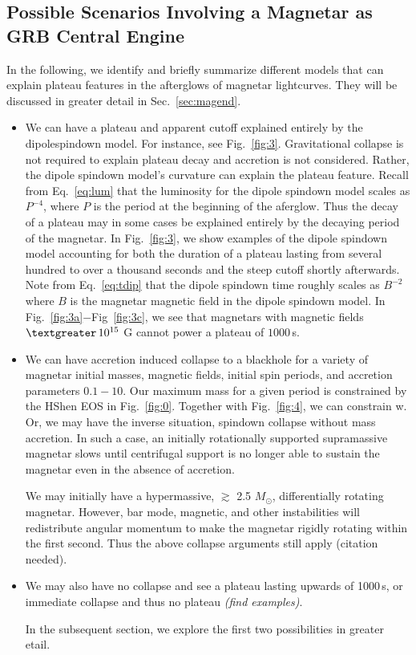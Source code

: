 \documentclass{article}
\begin{document}
\subsection{Possible Scenarios Involving a Magnetar as GRB Central Engine}

In the following, we identify and briefly summarize different models that can explain plateau features in the afterglows of magnetar lightcurves. They will be discussed in greater detail in Sec.~\ref{sec:magend}.

\begin{itemize}
\item We can have a plateau and apparent cutoff explained entirely by the dipolespindown model. For instance, see Fig.~\ref{fig:3}. Gravitational collapse is not required to explain plateau decay and accretion is not considered. Rather, the dipole spindown model's curvature can explain the plateau feature. Recall from Eq.~\ref{eq:lum} that the luminosity for the dipole spindown model scales as $P^{-4}$, where $P$ is the period at the beginning of the aferglow. Thus the decay of a plateau may in some cases be explained entirely by the decaying period of the magnetar. In Fig.~\ref{fig:3}, we show examples of the dipole spindown model accounting for both the duration of a plateau lasting from several hundred to over a thousand seconds and the steep cutoff shortly afterwards. Note from Eq.~\ref{eq:tdip} that the dipole spindown time roughly scales as $B^{-2}$ where $B$ is the magnetar magnetic field in the dipole spindown model. In Fig.~\ref{fig:3a}$-$Fig~\ref{fig:3c}, we see that magnetars with magnetic fields $\textgreater\,10^{15}$ G cannot power a plateau of $1000$\,s. \newline

\item We can have accretion induced collapse to a blackhole for a variety of magnetar initial masses, magnetic fields, initial spin periods, and accretion parameters $0.1-10$. Our maximum mass for a given period is constrained by the HShen EOS in Fig.~\ref{fig:0}. Together with Fig.~\ref{fig:4}, we can constrain w. Or, we may have the inverse situation, spindown collapse without mass accretion. In such a case, an initially rotationally supported supramassive magnetar slows until centrifugal support is no longer able to sustain the magnetar even in the absence of accretion.  \newline

We may initially have a hypermassive, $\gtrsim$ 2.5 $M_{\odot}$,  differentially rotating magnetar. However, bar mode, magnetic, and other instabilities will redistribute angular momentum to make the magnetar rigidly rotating within the first second. Thus the above collapse arguments still apply (citation needed). \newline

\item We may also  have no collapse and see a plateau lasting upwards of 1000\,s, or immediate collapse and thus no plateau \textit{(find examples)}.

In the subsequent section, we explore the first two possibilities in greater etail.

\end{itemize}
\end{document}
